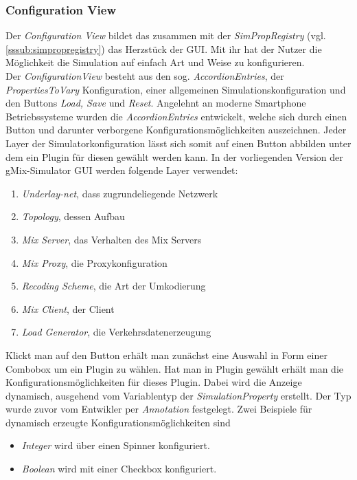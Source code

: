 \documentclass[a4paper, 11pt]{article} %
\begin{document}
\subsubsection{Configuration View} %
\label{ssub:configview}
Der \emph{Configuration View} bildet das zusammen mit der \emph{SimPropRegistry} (vgl. \ref{sssub:simpropregistry}) das Herzstück der GUI. Mit ihr hat der Nutzer die Möglichkeit die Simulation auf einfach Art und Weise zu konfigurieren. \\
Der \emph{ConfigurationView} besteht aus den sog. \emph{AccordionEntries}, der \emph{PropertiesToVary} Konfiguration, einer allgemeinen Simulationskonfiguration und den Buttons \emph{Load, Save} und \emph{Reset}. Angelehnt an moderne Smartphone Betriebssysteme wurden die \emph{AccordionEntries} entwickelt, welche sich durch einen Button und darunter verborgene Konfigurationsmöglichkeiten auszeichnen. Jeder Layer der Simulatorkonfiguration lässt sich somit auf einen Button abbilden unter dem ein Plugin für diesen gewählt werden kann. In der vorliegenden Version der gMix-Simulator GUI werden folgende Layer verwendet:
\begin{enumerate}
\item \emph{Underlay-net}, dass zugrundeliegende Netzwerk
\item \emph{Topology}, dessen Aufbau
\item \emph{Mix Server}, das Verhalten des Mix Servers
\item \emph{Mix Proxy}, die Proxykonfiguration
\item \emph{Recoding Scheme}, die Art der Umkodierung
\item \emph{Mix Client}, der Client
\item \emph{Load Generator}, die Verkehrsdatenerzeugung
\end{enumerate}
 Klickt man auf den Button erhält man zunächst eine Auswahl in Form einer Combobox um ein Plugin zu wählen. Hat man in Plugin gewählt erhält man die Konfigurationsmöglichkeiten für dieses Plugin. Dabei wird die Anzeige dynamisch, ausgehend vom Variablentyp der \emph{SimulationProperty} erstellt. Der Typ wurde zuvor vom Entwikler per \emph{Annotation} festgelegt. Zwei Beispiele für dynamisch erzeugte Konfigurationsmöglichkeiten sind
 \begin{itemize}
 \item \emph{Integer} wird über einen Spinner konfiguriert. 
 \item \emph{Boolean} wird mit einer Checkbox konfiguriert.
 \end{itemize}
\end{document}
